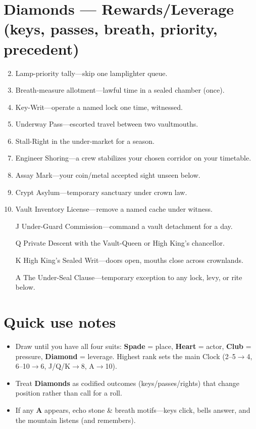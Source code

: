 \section{Diamonds --- Rewards/Leverage (keys, passes, breath, priority, precedent)}
\label{sec:aeler-rewards}
\begin{enumerate}
\setcounter{enumi}{1}
\item Lamp-priority tally---skip one lamplighter queue.
\item Breath-measure allotment---lawful time in a sealed chamber (once).
\item Key-Writ---operate a named lock one time, witnessed.
\item Underway Pass---escorted travel between two vaultmouths.
\item Stall-Right in the under-market for a season.
\item Engineer Shoring---a crew stabilizes your chosen corridor on your timetable.
\item Assay Mark---your coin/metal accepted sight unseen below.
\item Crypt Asylum---temporary sanctuary under crown law.
\item Vault Inventory License---remove a named cache under witness.
\item[J] Under-Guard Commission---command a vault detachment for a day.
\item[Q] Private Descent with the Vault-Queen or High King's chancellor.
\item[K] High King's Sealed Writ---doors open, mouths close across crownlands.
\item[A] The Under-Seal Clause---temporary exception to any lock, levy, or rite below.
\end{enumerate}

\section*{Quick use notes}
\label{sec:aeler-quick-use}
\begin{itemize}
\item Draw until you have all four suits: \textbf{Spade} = place, \textbf{Heart} = actor, \textbf{Club} = pressure, \textbf{Diamond} = leverage. Highest rank sets the main Clock (2--5$\rightarrow$4, 6--10$\rightarrow$6, J/Q/K$\rightarrow$8, A$\rightarrow$10).
\item Treat \textbf{Diamonds} as codified outcomes (keys/passes/rights) that change position rather than call for a roll.
\item If any \textbf{A} appears, echo stone \& breath motifs---keys click, bells answer, and the mountain listens (and remembers).
\end{itemize}

